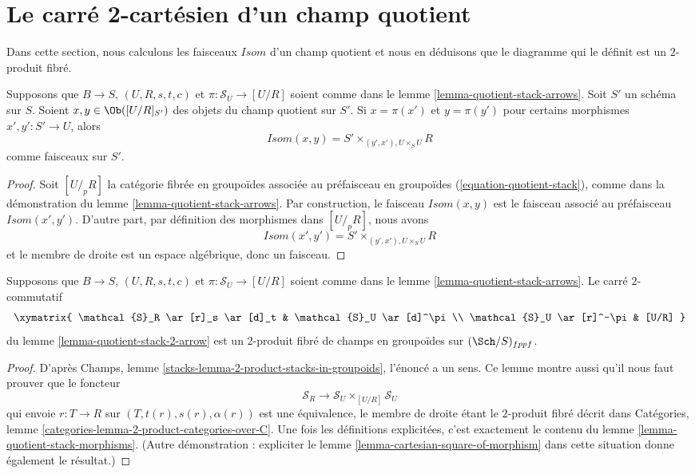 \section{Le carré 2-cartésien d'un champ quotient}
\label{section-quotient-stack-2-cartesian}

\noindent
Dans cette section, nous calculons les faisceaux $\mathit{Isom}$ d'un champ quotient et nous en déduisons que le diagramme qui le définit est un $2$-produit fibré.

\begin{lemma}
\label{lemma-quotient-stack-morphisms}
Supposons que $B \to S$, $(U, R, s, t, c)$ et $\pi : \mathcal{S}_U \to [U/R]$ soient comme dans le lemme \ref{lemma-quotient-stack-arrows}. Soit $S'$ un schéma sur $S$. Soient $x, y \in \Ob([U/R]_{S'})$ des objets du champ quotient sur $S'$. Si $x = \pi(x')$ et $y = \pi(y')$ pour certains morphismes $x', y' : S' \to U$, alors
$$
\mathit{Isom}(x, y) = S' \times_{(y', x'), U \times_S U} R
$$
comme faisceaux sur $S'$.
\end{lemma}

\begin{proof}
Soit $[U/_{\!p}R]$ la catégorie fibrée en groupoïdes associée au préfaisceau en groupoïdes (\ref{equation-quotient-stack}), comme dans la démonstration du lemme \ref{lemma-quotient-stack-arrows}. Par construction, le faisceau $\mathit{Isom}(x, y)$ est le faisceau associé au préfaisceau $\mathit{Isom}(x', y')$. D'autre part, par définition des morphismes dans $[U/_{\!p}R]$, nous avons
$$
\mathit{Isom}(x', y') = S' \times_{(y', x'), U \times_S U} R
$$
et le membre de droite est un espace algébrique, donc un faisceau.
\end{proof}

\begin{lemma}
\label{lemma-quotient-stack-2-cartesian}
Supposons que $B \to S$, $(U, R, s, t, c)$ et $\pi : \mathcal{S}_U \to [U/R]$ soient comme dans le lemme \ref{lemma-quotient-stack-arrows}. Le carré $2$-commutatif
$$
\xymatrix{
\mathcal{S}_R \ar[r]_s \ar[d]_t & \mathcal{S}_U \ar[d]^\pi \\
\mathcal{S}_U \ar[r]^-\pi & [U/R]
}
$$
du lemme \ref{lemma-quotient-stack-2-arrow} est un $2$-produit fibré de champs en groupoïdes sur $(\Sch/S)_{fppf}$.
\end{lemma}

\begin{proof}
D'après Champs, lemme \ref{stacks-lemma-2-product-stacks-in-groupoids}, l'énoncé a un sens. Ce lemme montre aussi qu'il nous faut prouver que le foncteur
$$
\mathcal{S}_R \longrightarrow \mathcal{S}_U \times_{[U/R]} \mathcal{S}_U
$$
qui envoie $r : T \to R$ sur $(T, t(r), s(r), \alpha(r))$ est une équivalence, le membre de droite étant le $2$-produit fibré décrit dans Catégories, lemme \ref{categories-lemma-2-product-categories-over-C}. Une fois les définitions explicitées, c'est exactement le contenu du lemme \ref{lemma-quotient-stack-morphisms}. (Autre démonstration : expliciter le lemme \ref{lemma-cartesian-square-of-morphism} dans cette situation donne également le résultat.)
\end{proof}

